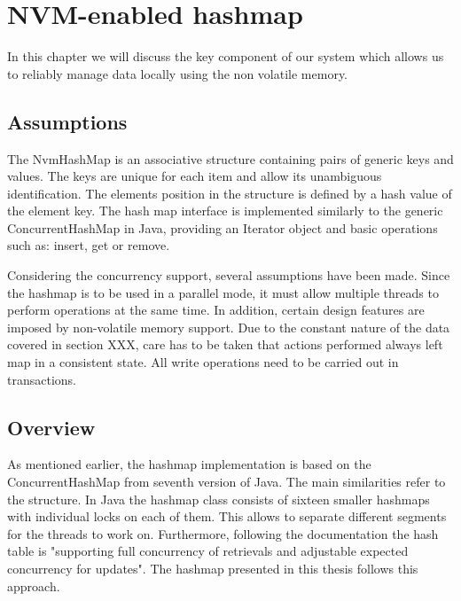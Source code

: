 \chapter{NVM-enabled hashmap}
In this chapter we will discuss the key component of our system which allows us to reliably manage data locally using the non volatile memory. 

\section{Assumptions}
    The NvmHashMap is an associative structure containing pairs of generic keys and values. The keys are unique for each item and allow its unambiguous identification. The elements position in the structure is defined by a hash value of the element key. The hash map interface is implemented similarly to the generic ConcurrentHashMap in Java, providing an Iterator object and basic operations such as: insert, get or remove. 
    
    Considering the concurrency support, several assumptions have been made. Since the hashmap is to be used in a parallel mode, it must allow multiple threads to perform operations at the same time. In addition, certain design features are imposed by non-volatile memory support. Due to the constant nature of the data covered in section XXX, care has to be taken that actions performed always left map in a consistent state. All write operations need to be carried out in transactions.
    
\section{Overview}
    As mentioned earlier, the hashmap implementation is based on the ConcurrentHashMap from seventh version of Java. The main similarities refer to the structure. In Java the hashmap class consists of sixteen smaller hashmaps with individual locks on each of them. This allows to separate different segments for the threads to work on. Furthermore, following the documentation the hash table is "supporting full concurrency of retrievals and adjustable expected concurrency for updates". The hashmap presented in this thesis follows this approach. 
    
    

